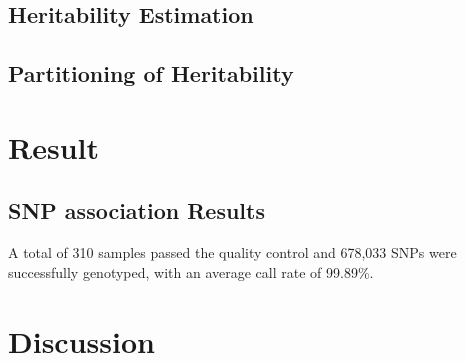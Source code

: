 	\subsection{Heritability Estimation}
	\subsection{Partitioning of Heritability}
	
	\section{Result}
	\subsection{SNP association Results}
	A total of 310 samples passed the quality control and 678,033 \glspl{SNP} were successfully genotyped, with an average call rate of 99.89\%. 
	
	
	\section{Discussion}
	
	
	
	
	
	